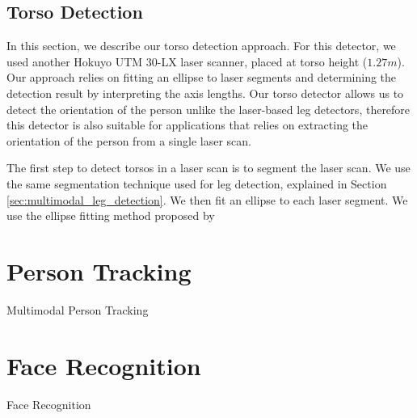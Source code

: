 \documentclass[12pt]{gatech-thesis}
\begin{document}
\subsection{Torso Detection}
\label{sec:multimodal_torso_detection}

In this section, we describe our torso detection approach. For this detector, we used another Hokuyo UTM 30-LX laser scanner, placed at torso height ($1.27m$). Our approach relies on fitting an ellipse to laser segments and determining the detection result by interpreting the axis lengths. Our torso detector allows us to detect the orientation of the person unlike the laser-based leg detectors, therefore this detector is also suitable for applications that relies on extracting the orientation of the person from a single laser scan.

The first step to detect torsos in a laser scan is to segment the laser scan. We use the same segmentation technique used for leg detection, explained in Section \ref{sec:multimodal_leg_detection}. We then fit an ellipse to each laser segment. We use the ellipse fitting method proposed by 



\section{Person Tracking}
\label{sec:multimodal_person_tracking}

Multimodal Person Tracking

\section{Face Recognition}
\label{sec:multimodal_face_recognition}

Face Recognition


\end{document}
